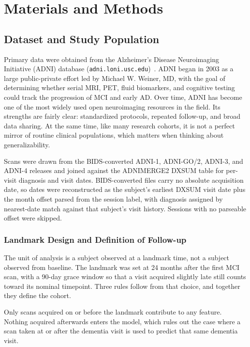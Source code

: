 \documentclass[blue]{ludusofficial}  %
\begin{document}
\section{Materials and Methods}

\subsection{Dataset and Study Population}

Primary data were obtained from the Alzheimer's Disease Neuroimaging Initiative (ADNI) database (\texttt{adni.loni.usc.edu})~\cite{weiner2010adni,petersen2010adni}. ADNI began in 2003 as a large public-private effort led by Michael W. Weiner, MD, with the goal of determining whether serial MRI, PET, fluid biomarkers, and cognitive testing could track the progression of MCI and early AD. Over time, ADNI has become one of the most widely used open neuroimaging resources in the field. Its strengths are fairly clear: standardized protocols, repeated follow-up, and broad data sharing. At the same time, like many research cohorts, it is not a perfect mirror of routine clinical populations, which matters when thinking about generalizability.

Scans were drawn from the BIDS-converted ADNI-1, ADNI-GO/2, ADNI-3, and ADNI-4 releases and joined against the ADNIMERGE2 DXSUM table for per-visit diagnosis and visit dates. BIDS-converted files carry no absolute acquisition date, so dates were reconstructed as the subject's earliest DXSUM visit date plus the month offset parsed from the session label, with diagnosis assigned by nearest-date match against that subject's visit history. Sessions with no parseable offset were skipped.

\subsubsection{Landmark Design and Definition of Follow-up}
\label{sec:landmark}

The unit of analysis is a subject observed at a landmark time, not a subject observed from baseline. The landmark was set at 24 months after the first MCI scan, with a 90-day grace window so that a visit acquired slightly late still counts toward its nominal timepoint. Three rules follow from that choice, and together they define the cohort.

Only scans acquired on or before the landmark contribute to any feature. Nothing acquired afterwards enters the model, which rules out the case where a scan taken at or after the dementia visit is used to predict that same dementia visit.
\end{document}
